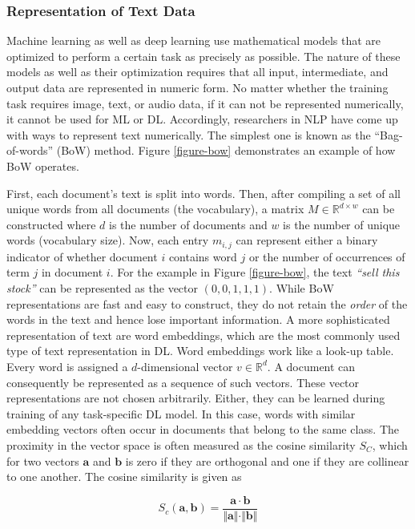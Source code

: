 \subsubsection{Representation of Text Data}
\label{section-text-repr-theory}
Machine learning as well as deep learning use mathematical models that are optimized to perform a certain task as precisely as possible. The nature of these models as well as their optimization requires that all input, intermediate, and output data are represented in numeric form. No matter whether the training task requires image, text, or audio data, if it can not be represented numerically, it cannot be used for ML or DL. Accordingly, researchers in NLP have come up with ways to represent text numerically. The simplest one is known as the ``Bag-of-words'' (BoW) method. Figure \ref{figure-bow} demonstrates an example of how BoW operates.



 First, each document's text is split into words. Then, after compiling a set of all unique words from all documents (the vocabulary), a matrix $M \in \mathbb{R}^{d \times w}$ can be constructed where $d$ is the number of documents and $w$ is the number of unique words (vocabulary size). Now, each entry $m_{i,j}$ can represent either a binary indicator of whether document $i$ contains word $j$ or the number of occurrences of term $j$ in document $i$. For the example in Figure \ref{figure-bow}, the text \emph{``sell this stock''} can be represented as the vector $(0,0,1,1,1)$. While BoW representations are fast and easy to construct, they do not retain the \emph{order} of the words in the text and hence lose important information. A more sophisticated representation of text are word embeddings, which are the most commonly used type of text representation in DL. Word embeddings work like a look-up table. Every word is assigned a $d$-dimensional vector $v \in \mathbb{R}^{d}$. A document can consequently be represented as a sequence of such vectors. These vector representations are not chosen arbitrarily. Either, they can be learned during training of any task-specific DL model. In this case, words with similar embedding vectors often occur in documents that belong to the same class. The proximity in the vector space is often measured as the cosine similarity $S_C$, which for two vectors $\bm{a}$ and $\bm{b}$ is zero if they are orthogonal and one if they are collinear to one another. The cosine similarity is given as

\begin{equation}
	S_c(\bm{a}, \bm{b}) = \frac{\bm{a} \cdot \bm{b}}{\Vert \bm{a} \Vert \cdot \Vert \bm{b} \Vert}
\end{equation} 

